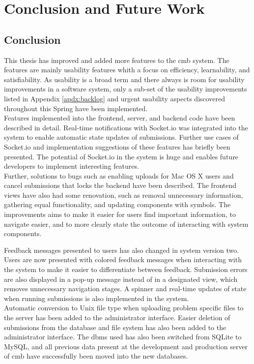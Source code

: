 \chapter{Conclusion and Future Work}
\label{ch:conclusion}

\section{Conclusion}
This thesis has improved and added more features to the \gls{cmb} system. The features are mainly usability features whith a focus on efficiency, learnability, and satisfiability. As usability is a broad term and there always is room for usability improvements in a software system, only a sub-set of the usability improvements listed in Appendix \ref{apdx:backlog} and urgent usability aspects discovered throughout this Spring have been implemented. \\

Features implemented into the frontend, server, and backend code have been described in detail. Real-time notifications with Socket.io was integrated into the system to enable automatic state updates of submissions.  Further use cases of Socket.io and implementation suggestions of these features has briefly been presented. The potential of Socket.io in the system is huge and enables future developers to implement interesting features. \\

Further, solutions to bugs such as enabling uploads for Mac OS X users and cancel submissions that locks the backend have been described. The frontend views have also had some renovation, such as removal unnecessary information, gathering equal functionality, and updating components with symbols. The improvements aims to make it easier for users find important information, to navigate easier, and to more clearly state the outcome of interacting with system components.

Feedback messages presented to users has also changed in system version two. Users are now presented with colored feedback messages when interacting with the system to make it easier to differentiate between feedback. Submission errors are also displayed in a pop-up message instead of in a designated view, which removes unnecessary navigation stages. A spinner and real-time updates of state when running submissions is also implemented in the system. \\

Automatic conversion to Unix file type when uploading problem specific files to the server has been added to the administrator interface. Easier deletion of submissions from the database and file system has also been added to the administrator interface. The \gls{dbms} used has also been switched from SQLite to MySQL, and all previous data present at the development and production server of \gls{cmb} have successfully been moved into the new databases. \\

